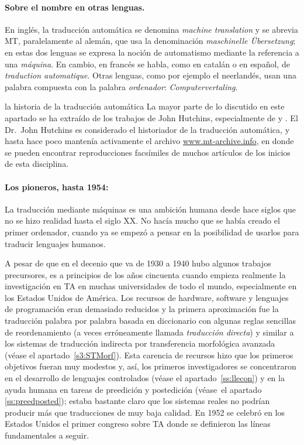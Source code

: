 \paragraph{Sobre el nombre en otras lenguas.} En inglés, la traducción automática se denomina \emph{machine translation} y se abrevia MT, paralelamente al alemán, que usa la denominación \emph{maschinelle Übersetzung}; en estas dos lenguas se expresa la noción de automatismo mediante la referencia a una {\em máquina}. En cambio, en francés se habla, como en catalán o en español, de {\em traduction automatique}. Otras lenguas, como por ejemplo el neerlandés, usan una palabra compuesta con la palabra \emph{ordenador}: \emph{Computervertaling}. 

\begin{persabermes}{la historia de la traducción automática} La mayor parte de lo discutido en este apartado se ha extraído de los trabajos de John Hutchins, especialmente de \cite{hutchins1995} y \cite{hutchins2001}. El Dr.\ John Hutchins es considerado el historiador de la traducción automática, y hasta hace poco mantenía activamente el archivo \url{www.mt-archive.info}, en donde se pueden encontrar reproducciones facsímiles de muchos artículos de los inicios de esta disciplina. 

\paragraph{Los pioneros, hasta 1954:} La traducción mediante máquinas es una ambición humana desde hace siglos que no se hizo realidad hasta el siglo XX. No hacía mucho que se había creado el primer ordenador, cuando ya se empezó a pensar en la posibilidad de usarlos para traducir lenguajes humanos. 

A pesar de que en el decenio que va de 1930 a 1940 hubo algunos trabajos precursores, es a principios de los años cincuenta cuando empieza realmente la investigación en TA en muchas universidades de todo el mundo, especialmente en los Estados Unidos de América. Los recursos de hardware, software y lenguajes de programación eran demasiado reducidos y la primera aproximación fue la traducción palabra por palabra basada en diccionario con algunas reglas sencillas de reordenamiento (a veces erróneamente llamada \emph{traducción directa}) y similar a los sistemas de traducción indirecta por transferencia morfológica avanzada (véase el apartado~\ref{s3:STMorf}). Esta carencia de recursos hizo que los primeros objetivos fueran muy modestos y, así, los primeros investigadores se concentraron en el desarrollo de lenguajes controlados (véase el apartado~\ref{ss:llecon}) y en la ayuda humana en tareas de preedición y postedición (véase~el apartado \ref{ss:preedposted}); estaba bastante claro que los sistemas reales no podrían producir más que traducciones de muy baja calidad. En 1952 se celebró en los Estados Unidos el primer congreso sobre TA donde se definieron las líneas fundamentales a seguir. 


\end{persabermes}
